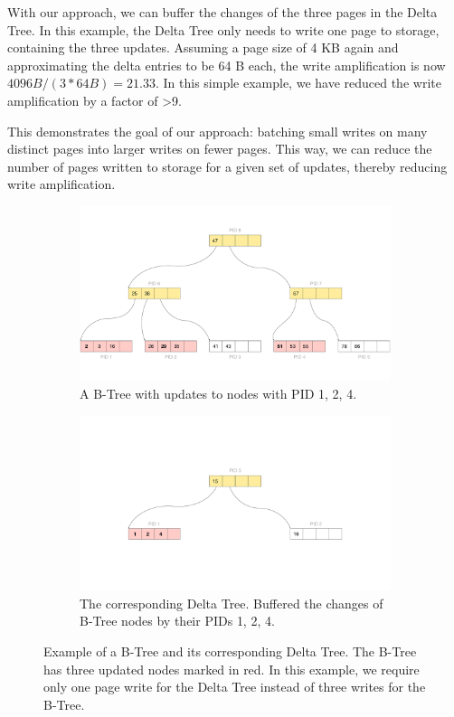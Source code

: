 With our approach, we can buffer the changes of the three pages in the Delta Tree.
In this example, the Delta Tree only needs to write one page to storage, containing the three updates.
Assuming a page size of 4 KB again and approximating the delta entries to be 64 B each, the write amplification is now $4096 B / (3 * 64 B) = 21.33$.
In this simple example, we have reduced the write amplification by a factor of >9.

This demonstrates the goal of our approach: batching small writes on many distinct pages into larger writes on fewer pages.
This way, we can reduce the number of pages written to storage for a given set of updates, thereby reducing write amplification.

\begin{figure}[htpb]
  \centering
  \begin{subfigure}[t]{0.95\textwidth}
    \centering
    \includegraphics[width=\textwidth]{figures/b_tree_with_pid.pdf}
    \caption{A B-Tree with updates to nodes with \ac{PID} {1, 2, 4}.}
  \end{subfigure}
  \hfill
  \begin{subfigure}[t]{0.95\textwidth}
    \centering
    \includegraphics[width=\textwidth]{figures/delta_tree_update.pdf}
    \caption{The corresponding Delta Tree. Buffered the changes of B-Tree nodes by their \ac{PID}s {1, 2, 4}.}
  \end{subfigure}
  \caption{Example of a B-Tree and its corresponding Delta Tree. The B-Tree has three updated nodes marked in red. In this example, we require only one page write for the Delta Tree instead of three writes for the B-Tree.}
  \label{fig:delta-tree-example}
\end{figure}
